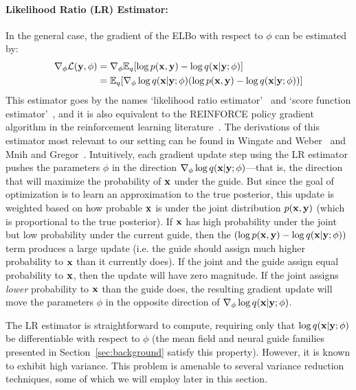 \paragraph{Likelihood Ratio (LR) Estimator:}
In the general case, the gradient of the ELBo with respect to $\phi$ can be estimated by:
\begin{align}
\begin{split}
\nabla_\phi \mathcal{L}(\mathbf{y}, \phi)
&= \nabla_\phi \mathbb{E}_{q}[ \log p(\mathbf{x}, \mathbf{y}) - \log q(\mathbf{x} | \mathbf{y} ; \phi) ]\\
&= \mathbb{E}_{q}[ \nabla_\phi \log q(\mathbf{x} | \mathbf{y} ; \phi) ( \log p(\mathbf{x}, \mathbf{y}) - \log q(\mathbf{x} | \mathbf{y} ; \phi) ) ]
\end{split}
\label{eq:lr}
\end{align}
This estimator goes by the names `likelihood ratio estimator'~\cite{LikelihoodRatioEstimator} and `score function estimator'~\cite{ScoreFunctionEstimator}, and it is also equivalent to the REINFORCE policy gradient algorithm in the reinforcement learning literature~\cite{REINFORCE}. The derivations of this estimator most relevant to our setting can be found in Wingate and Weber~\cite{AVIPP} and Mnih and Gregor~\cite{NVIL}.
Intuitively, each gradient update step using the LR estimator pushes the parameters $\phi$ in the direction $\nabla_\phi \log q(\mathbf{x} | \mathbf{y} ; \phi)$---that is, the direction that will maximize the probability of $\mathbf{x}$ under the guide. But since the goal of optimization is to learn an approximation to the true posterior, this update is weighted based on how probable $\mathbf{x}$ is under the joint distribution $p(\mathbf{x}, \mathbf{y})$ (which is proportional to the true posterior). If $\mathbf{x}$ has high probability under the joint but low probability under the current guide, then the $( \log p(\mathbf{x}, \mathbf{y}) - \log q(\mathbf{x} | \mathbf{y} ; \phi) )$ term produces a large update (i.e. the guide should assign much higher probability to $\mathbf{x}$ than it currently does). If the joint and the guide assign equal probability to $\mathbf{x}$, then the update will have zero magnitude. If the joint assigns \emph{lower} probability to $\mathbf{x}$ than the guide does, the resulting gradient update will move the parameters $\phi$ in the opposite direction of $\nabla_\phi \log q(\mathbf{x} | \mathbf{y} ; \phi)$.

The LR estimator is straightforward to compute, requiring only that $\log q(\mathbf{x} | \mathbf{y} ; \phi)$ be differentiable with respect to $\phi$ (the mean field and neural guide families presented in Section~\ref{sec:background} satisfy this property). However, it is known to exhibit high variance. This problem is amenable to several variance reduction techniques, some of which we will employ later in this section.

